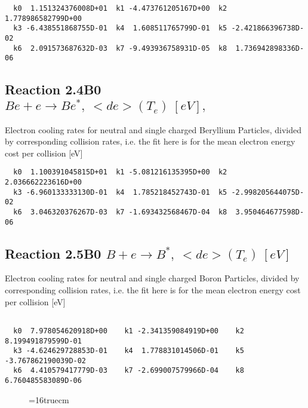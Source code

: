 \documentclass[12pt,dvipdfmx]{article}
\begin{document}
{\begin{small}\begin{verbatim}
  k0  1.151324376008D+01  k1 -4.473761205167D+00  k2  1.778986582799D+00
  k3 -6.438551868755D-01  k4  1.608511765799D-01  k5 -2.421866396738D-02
  k6  2.091573687632D-03  k7 -9.493936758931D-05  k8  1.736942898336D-06

\end{verbatim}\end{small}


\subsection{
Reaction 2.4B0  $   Be + e \rightarrow Be^*,   \ <de>(T_e)  \ [eV],$
}

  Electron cooling rates for neutral and single
  charged Beryllium Particles, divided by corresponding collision rates, i.e. the fit here is for the mean electron energy cost per collision [eV]

\begin{small}\begin{verbatim}
  k0  1.100391045815D+01  k1 -5.081216135395D+00  k2  2.036662223616D+00
  k3 -6.960133333130D-01  k4  1.785218452743D-01  k5 -2.998205644075D-02
  k6  3.046320376267D-03  k7 -1.693432568467D-04  k8  3.950464677598D-06

\end{verbatim}\end{small}
\subsection{
Reaction 2.5B0   $  B + e \rightarrow B^*,  \ <de>(T_e) \ [eV] $
}

 Electron cooling rates for neutral and single
 charged Boron Particles, divided by corresponding collision rates, i.e. the fit here is for the mean electron energy cost per collision [eV]

\begin{small}\begin{verbatim}

  k0  7.978054620918D+00    k1 -2.341359084919D+00    k2  8.199491879599D-01
  k3 -4.624629728853D-01    k4  1.778831014506D-01    k5 -3.767862190039D-02
  k6  4.410579417779D-03    k7 -2.699007579966D-04    k8  6.760485583089D-06

\end{verbatim}\end{small}
\begin{figure} \label{2.5ll}
\epsfxsize=16truecm
\end{figure}
\newpage

}
\end{document}

